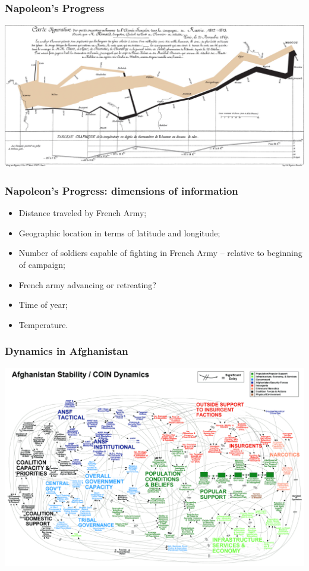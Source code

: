 \documentclass[aspectratio=169]{beamer}
\theoremstyle{principle}
\begin{document}
\begin{frame}
\frametitle{Napoleon's Progress}
\begin{center}
\includegraphics[scale=0.28]{Minard.png}
\end{center}

\end{frame}

\begin{frame}
\frametitle{Napoleon's Progress: dimensions of information}

\begin{itemize}
\item Distance traveled by French Army;
\bigskip
\item Geographic location in terms of latitude and longitude;
\bigskip
\item Number of soldiers capable of fighting in French Army -- relative to beginning of campaign;
\bigskip
\item French army advancing or retreating?
\bigskip
\item Time of year;
\bigskip
\item Temperature.
\end{itemize}

\end{frame}

\begin{frame}
\frametitle{Dynamics in Afghanistan}
\begin{center}
\includegraphics[scale=0.28]{afghan_coin.png}
\end{center}

\end{frame}
\end{document}
